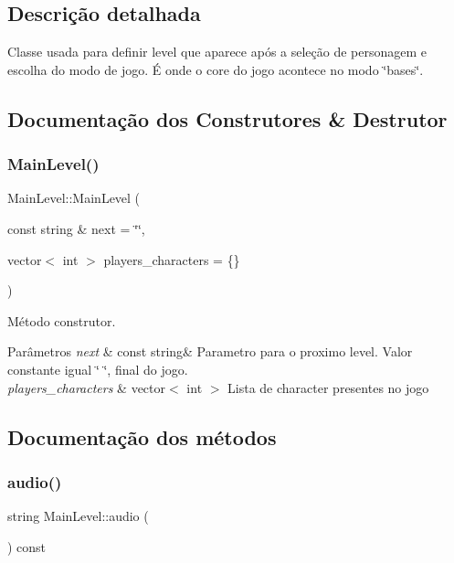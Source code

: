 \subsection{Descrição detalhada}
Classe usada para definir level que aparece após a seleção de personagem e escolha do modo de jogo. É onde o core do jogo acontece no modo \char`\"{}bases\char`\"{}. 

\subsection{Documentação dos Construtores \& Destrutor}
\mbox{\label{classMainLevel_a0d8c61bddf5781cea1ba8496bd0a3d80}} 
\subsubsection{\texorpdfstring{Main\+Level()}{MainLevel()}}
{\footnotesize\ttfamily Main\+Level\+::\+Main\+Level (\begin{DoxyParamCaption}\item[{const string \&}]{next = {\ttfamily \char`\"{}\char`\"{}},  }\item[{vector$<$ int $>$}]{players\+\_\+characters = {\ttfamily \{\}} }\end{DoxyParamCaption})}



Método construtor. 


\begin{DoxyParams}{Parâmetros}
{\em next} & const string\& Parametro para o proximo level. Valor constante igual \char`\"{} \char`\"{}, final do jogo. \\
\hline
{\em players\+\_\+characters} & vector$<$ int $>$ Lista de character presentes no jogo \\
\hline
\end{DoxyParams}


\subsection{Documentação dos métodos}
\mbox{\label{classMainLevel_ae101ab154173ca819a5eb701508ad635}} 
\subsubsection{\texorpdfstring{audio()}{audio()}}
{\footnotesize\ttfamily string Main\+Level\+::audio (\begin{DoxyParamCaption}{ }\end{DoxyParamCaption}) const}



